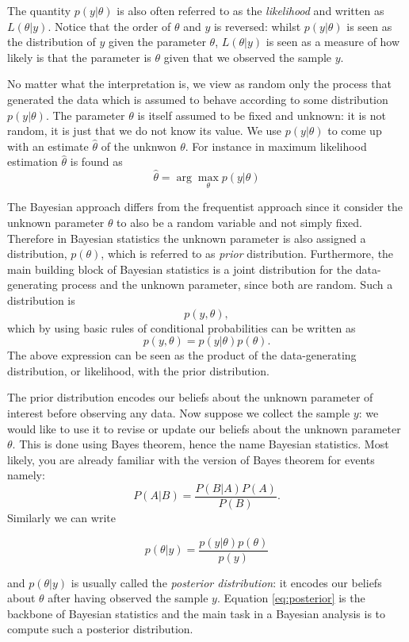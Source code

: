 \documentclass[
]{book}
\begin{document}
The quantity \(p(y|\theta)\) is also often referred to as the \emph{likelihood} and written as \(L(\theta|y)\). Notice that the order of \(\theta\) and \(y\) is reversed: whilst \(p(y|\theta)\) is seen as the distribution of \(y\) given the parameter \(\theta\), \(L(\theta|y)\) is seen as a measure of how likely is that the parameter is \(\theta\) given that we observed the sample \(y\).

No matter what the interpretation is, we view as random only the process that generated the data which is assumed to behave according to some distribution \(p(y|\theta)\). The parameter \(\theta\) is itself assumed to be fixed and unknown: it is not random, it is just that we do not know its value. We use \(p(y|\theta)\) to come up with an estimate \(\hat\theta\) of the unknwon \(\theta\). For instance in maximum likelihood estimation \(\hat\theta\) is found as
\[
\hat\theta = \arg\max_{\theta} p(y|\theta)
\]

The Bayesian approach differs from the frequentist approach since it consider the unknown parameter \(\theta\) to also be a random variable and not simply fixed. Therefore in Bayesian statistics the unknown parameter is also assigned a distribution, \(p(\theta)\), which is referred to as \emph{prior} distribution. Furthermore, the main building block of Bayesian statistics is a joint distribution for the data-generating process and the unknown parameter, since both are random. Such a distribution is
\[
p(y,\theta),
\]
which by using basic rules of conditional probabilities can be written as
\[
p(y,\theta) = p(y|\theta)p(\theta).
\]
The above expression can be seen as the product of the data-generating distribution, or likelihood, with the prior distribution.

The prior distribution encodes our beliefs about the unknown parameter of interest before observing any data. Now suppose we collect the sample \(y\): we would like to use it to revise or update our beliefs about the unknown parameter \(\theta\). This is done using Bayes theorem, hence the name Bayesian statistics. Most likely, you are already familiar with the version of Bayes theorem for events namely:
\[
P(A|B) = \frac{P(B|A)P(A)}{P(B)}.
\]
Similarly we can write

\begin{equation}
 \label{eq:posterior}
p(\theta|y) = \frac{p(y|\theta)p(\theta)}{p(y)}
\end{equation}

and \(p(\theta|y)\) is usually called the \emph{posterior distribution}: it encodes our beliefs about \(\theta\) after having observed the sample \(y\). Equation \eqref{eq:posterior} is the backbone of Bayesian statistics and the main task in a Bayesian analysis is to compute such a posterior distribution.
\end{document}
